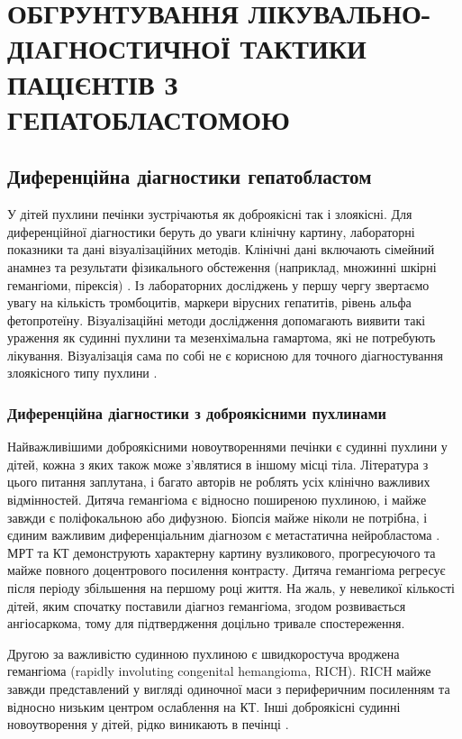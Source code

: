 \chapter{ОБГРУНТУВАННЯ ЛІКУВАЛЬНО-ДІАГНОСТИЧНОЇ ТАКТИКИ ПАЦІЄНТІВ З ГЕПАТОБЛАСТОМОЮ}
\section{Диференційна діагностики гепатобластом}
У дітей пухлини печінки зустрічаютья як доброякісні так і злоякісні. Для диференційної діагностики беруть до уваги клінічну картину, лабораторні показники та дані візуалізаційних методів. Клінічні дані включають сімейний анамнез  та результати фізикального обстеження (наприклад, множинні шкірні гемангіоми, пірексія) \cite{pmid20938901}. Із лабораторних досліджень у першу чергу звертаємо увагу на  кількість тромбоцитів, маркери вірусних гепатитів, рівень альфа фетопротеїну. Візуалізаційні методи дослідження допомагають виявити такі ураження як судинні пухлини та мезенхімальна гамартома, які не потребують лікування. Візуалізація сама по собі не є корисною для точного діагностування злоякісного типу пухлини \cite{pmid20922397}.
\subsection{Диференційна діагностики з доброякісними пухлинами}
Найважливішими доброякісними новоутвореннями печінки є судинні пухлини у дітей, кожна з яких також може з’являтися в іншому місці тіла. Література з цього питання заплутана, і багато авторів не роблять усіх клінічно важливих відмінностей. Дитяча гемангіома є відносно поширеною пухлиною, і майже завжди є поліфокальною або дифузною. Біопсія майже ніколи не потрібна, і єдиним важливим диференціальним діагнозом є метастатична нейробластома \cite{pmid21370433}. МРТ та КТ демонструють характерну картину вузликового, прогресуючого та майже повного доцентрового посилення контрасту. Дитяча гемангіома регресує після періоду збільшення на першому році життя. На жаль, у невеликої кількості дітей, яким спочатку поставили діагноз гемангіома, згодом розвивається ангіосаркома, тому для підтвердження доцільно тривале спостереження.

Другою за важливістю судинною пухлиною є швидкоростуча вроджена гемангіома (rapidly involuting congenital hemangioma, RICH). RICH майже завжди представлений у вигляді одиночної маси з периферичним посиленням та відносно низьким центром ослаблення на КТ. Інші доброякісні судинні новоутворення у дітей, рідко виникають в печінці \cite{pmid21509775}.

